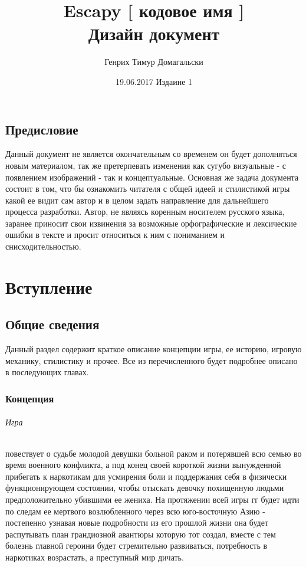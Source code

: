 \documentclass[11pt]{report}
\title{
	\textbf{Escapy [ кодовое имя ]\\Дизайн документ}
}
\author{Генрих Тимур Домагальски}
\date{19.06.2017 Издаине 1}
\begin{document}
\maketitle



\tableofcontents


\newpage
\chapter*{Предисловие}
Данный документ не является окончательным со временем он будет дополняться новым материалом, так же претерпевать изменения как сугубо визуальные - с появлением изображений - так и концептуальные. Основная же задача документа состоит в том, что бы ознакомить читателя с общей идеей и стилистикой игры какой ее видит сам автор и в целом задать направление для дальнейшего процесса разработки. Автор, не являясь коренным носителем русского языка, заранее приносит свои извинения за возможные орфографические и лексические ошибки в тексте и просит относиться к ним с пониманием и снисходительностью.





\part{Вступление}
\chapter{Общие сведения}
Данный раздел содержит краткое описание концепции игры, ее историю, игровую механику, стилистику и прочее. Все из перечисленного будет подробнее описано в последующих главах. \newpage



\section{Концепция}
\paragraph{Игра} повествует о судьбе молодой девушки больной раком и потерявшей всю семью во время военного конфликта, а под конец своей короткой жизни вынужденной прибегать к наркотикам для усмирения боли и поддержания себя в физически функционирующем состоянии, чтобы отыскать девочку похищенную людьми предположительно убившими ее жениха. На протяжении всей игры гг будет идти по следам ее мертвого возлюбленного через всю юго-восточную Азию - постепенно узнавая новые подробности из его прошлой жизни она будет распутывать план грандиозной авантюры которую тот создал, вместе с тем болезнь главной героини будет стремительно развиваться, потребность в наркотиках возрастать, а преступный мир дичать.
\end{document}
